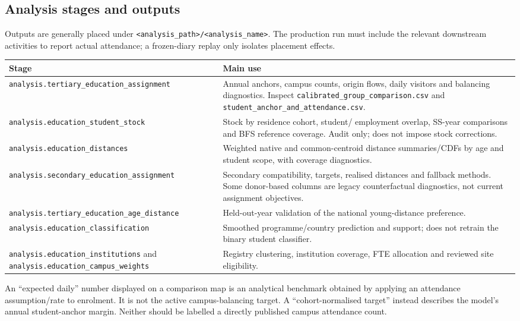 \documentclass[11pt,a4paper]{article}
\newcommand{\code}[1]{\nolinkurl{#1}}
\begin{document}
\subsection{Analysis stages and outputs}
Outputs are generally placed under \code{<analysis_path>/<analysis_name>}.
The production run must include the relevant downstream activities to report
actual attendance; a frozen-diary replay only isolates placement effects.

\begin{longtable}{L{.44\textwidth}L{.49\textwidth}}
\toprule Stage & Main use \\
\midrule\endhead
\code{analysis.tertiary_education_assignment} & Annual anchors, campus counts,
origin flows, daily visitors and balancing diagnostics. Inspect
\code{calibrated_group_comparison.csv} and
\code{student_anchor_and_attendance.csv}. \\
\code{analysis.education_student_stock} & Stock by residence cohort, student/
employment overlap, SS-year comparisons and BFS reference coverage. Audit only;
does not impose stock corrections. \\
\code{analysis.education_distances} & Weighted native and common-centroid
distance summaries/CDFs by age and student scope, with coverage diagnostics. \\
\code{analysis.secondary_education_assignment} & Secondary compatibility,
targets, realised distances and fallback methods. Some donor-based columns
are legacy counterfactual diagnostics, not current assignment objectives. \\
\code{analysis.tertiary_education_age_distance} & Held-out-year validation of the
national young-distance preference. \\
\code{analysis.education_classification} & Smoothed programme/country prediction
and support; does not retrain the binary student classifier. \\
\code{analysis.education_institutions} and
\code{analysis.education_campus_weights} & Registry clustering, institution
coverage, FTE allocation and reviewed site eligibility. \\
\bottomrule
\end{longtable}

An ``expected daily'' number displayed on a comparison map is an analytical
benchmark obtained by applying an attendance assumption/rate to enrolment.
It is not the active campus-balancing target. A ``cohort-normalised target''
instead describes the model's annual student-anchor margin. Neither should be
labelled a directly published campus attendance count.
\end{document}
